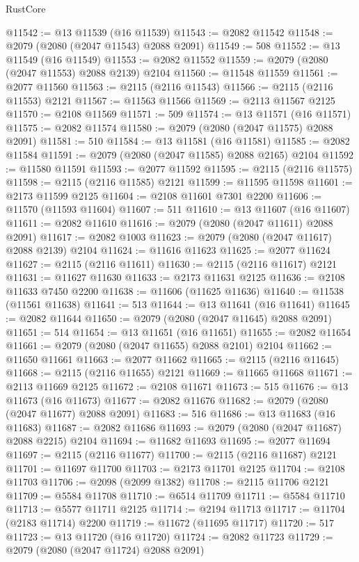 \begin{lexlean}{RustCore}
\begin{coremodule}
@11542 := @13 @11539 (@16 @11539)
@11543 := @2082 @11542
@11548 := @2079 (@2080 (@2047 @11543) @2088 @2091)
@11549 := 508
@11552 := @13 @11549 (@16 @11549)
@11553 := @2082 @11552
@11559 := @2079 (@2080 (@2047 @11553) @2088 @2139) @2104
@11560 := @11548 @11559
@11561 := @2077 @11560
@11563 := @2115 (@2116 @11543)
@11566 := @2115 (@2116 @11553) @2121
@11567 := @11563 @11566
@11569 := @2113 @11567 @2125
@11570 := @2108 @11569
@11571 := 509
@11574 := @13 @11571 (@16 @11571)
@11575 := @2082 @11574
@11580 := @2079 (@2080 (@2047 @11575) @2088 @2091)
@11581 := 510
@11584 := @13 @11581 (@16 @11581)
@11585 := @2082 @11584
@11591 := @2079 (@2080 (@2047 @11585) @2088 @2165) @2104
@11592 := @11580 @11591
@11593 := @2077 @11592
@11595 := @2115 (@2116 @11575)
@11598 := @2115 (@2116 @11585) @2121
@11599 := @11595 @11598
@11601 := @2173 @11599 @2125
@11604 := @2108 @11601 @7301 @2200
@11606 := @11570 (@11593 @11604)
@11607 := 511
@11610 := @13 @11607 (@16 @11607)
@11611 := @2082 @11610
@11616 := @2079 (@2080 (@2047 @11611) @2088 @2091)
@11617 := @2082 @1003
@11623 := @2079 (@2080 (@2047 @11617) @2088 @2139) @2104
@11624 := @11616 @11623
@11625 := @2077 @11624
@11627 := @2115 (@2116 @11611)
@11630 := @2115 (@2116 @11617) @2121
@11631 := @11627 @11630
@11633 := @2173 @11631 @2125
@11636 := @2108 @11633 @7450 @2200
@11638 := @11606 (@11625 @11636)
@11640 := @11538 (@11561 @11638)
@11641 := 513
@11644 := @13 @11641 (@16 @11641)
@11645 := @2082 @11644
@11650 := @2079 (@2080 (@2047 @11645) @2088 @2091)
@11651 := 514
@11654 := @13 @11651 (@16 @11651)
@11655 := @2082 @11654
@11661 := @2079 (@2080 (@2047 @11655) @2088 @2101) @2104
@11662 := @11650 @11661
@11663 := @2077 @11662
@11665 := @2115 (@2116 @11645)
@11668 := @2115 (@2116 @11655) @2121
@11669 := @11665 @11668
@11671 := @2113 @11669 @2125
@11672 := @2108 @11671
@11673 := 515
@11676 := @13 @11673 (@16 @11673)
@11677 := @2082 @11676
@11682 := @2079 (@2080 (@2047 @11677) @2088 @2091)
@11683 := 516
@11686 := @13 @11683 (@16 @11683)
@11687 := @2082 @11686
@11693 := @2079 (@2080 (@2047 @11687) @2088 @2215) @2104
@11694 := @11682 @11693
@11695 := @2077 @11694
@11697 := @2115 (@2116 @11677)
@11700 := @2115 (@2116 @11687) @2121
@11701 := @11697 @11700
@11703 := @2173 @11701 @2125
@11704 := @2108 @11703
@11706 := @2098 (@2099 @1382)
@11708 := @2115 @11706 @2121
@11709 := @5584 @11708
@11710 := @6514 @11709
@11711 := @5584 @11710
@11713 := @5577 @11711 @2125
@11714 := @2194 @11713
@11717 := @11704 (@2183 @11714) @2200
@11719 := @11672 (@11695 @11717)
@11720 := 517
@11723 := @13 @11720 (@16 @11720)
@11724 := @2082 @11723
@11729 := @2079 (@2080 (@2047 @11724) @2088 @2091)

\end{coremodule}
\end{lexlean}
